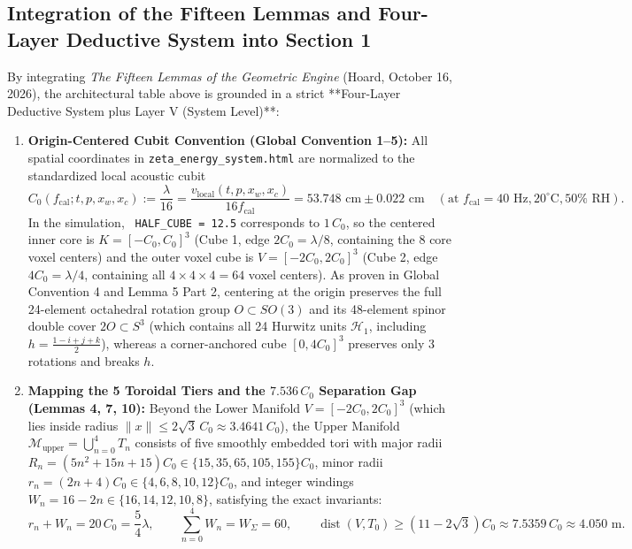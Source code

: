 \documentclass[11pt, a4paper]{article}
\begin{document}
\subsection{Integration of the Fifteen Lemmas and Four-Layer Deductive System into Section 1}
By integrating \textit{The Fifteen Lemmas of the Geometric Engine} (Hoard, October 16, 2026), the architectural table above is grounded in a strict **Four-Layer Deductive System plus Layer V (System Level)**:
\begin{enumerate}
    \item \textbf{Origin-Centered Cubit Convention (Global Convention 1--5):} All spatial coordinates in \texttt{zeta\_energy\_system.html} are normalized to the standardized local acoustic cubit
    \begin{equation}
    C_0(f_{\text{cal}}; t, p, x_w, x_c) := \frac{\lambda}{16} = \frac{v_{\text{local}}(t,p,x_w,x_c)}{16 f_{\text{cal}}} = 53.748\text{ cm} \pm 0.022\text{ cm} \quad (\text{at } f_{\text{cal}} = 40\text{ Hz}, 20^\circ\text{C}, 50\%\text{ RH}).
    \end{equation}
    In the simulation, \texttt{ HALF\_CUBE = 12.5} corresponds to $1\,C_0$, so the centered inner core is $K = [-C_0, C_0]^3$ (Cube 1, edge $2C_0 = \lambda/8$, containing the $8$ core voxel centers) and the outer voxel cube is $V = [-2C_0, 2C_0]^3$ (Cube 2, edge $4C_0 = \lambda/4$, containing all $4\times 4\times 4 = 64$ voxel centers). As proven in Global Convention 4 and Lemma 5 Part 2, centering at the origin preserves the full 24-element octahedral rotation group $O \subset SO(3)$ and its 48-element spinor double cover $2O \subset S^3$ (which contains all 24 Hurwitz units $\mathcal{H}_1$, including $h = \frac{1-i+j+k}{2}$), whereas a corner-anchored cube $[0, 4C_0]^3$ preserves only 3 rotations and breaks $h$.
    \item \textbf{Mapping the 5 Toroidal Tiers and the $7.536\,C_0$ Separation Gap (Lemmas 4, 7, 10):} Beyond the Lower Manifold $V = [-2C_0, 2C_0]^3$ (which lies inside radius $\|x\| \le 2\sqrt{3}\,C_0 \approx 3.4641\,C_0$), the Upper Manifold $\mathcal{M}_{\text{upper}} = \bigcup_{n=0}^4 T_n$ consists of five smoothly embedded tori with major radii $R_n = (5n^2 + 15n + 15)C_0 \in \{15, 35, 65, 105, 155\}C_0$, minor radii $r_n = (2n+4)C_0 \in \{4, 6, 8, 10, 12\}C_0$, and integer windings $W_n = 16 - 2n \in \{16, 14, 12, 10, 8\}$, satisfying the exact invariants:
    \begin{equation}
    r_n + W_n = 20\,C_0 = \frac{5}{4}\lambda, \qquad \sum_{n=0}^4 W_n = W_\Sigma = 60, \qquad \operatorname{dist}(V, T_0) \ge (11 - 2\sqrt{3})C_0 \approx 7.5359\,C_0 \approx 4.050\text{ m}.

\end{equation}
\end{enumerate}
\end{document}
